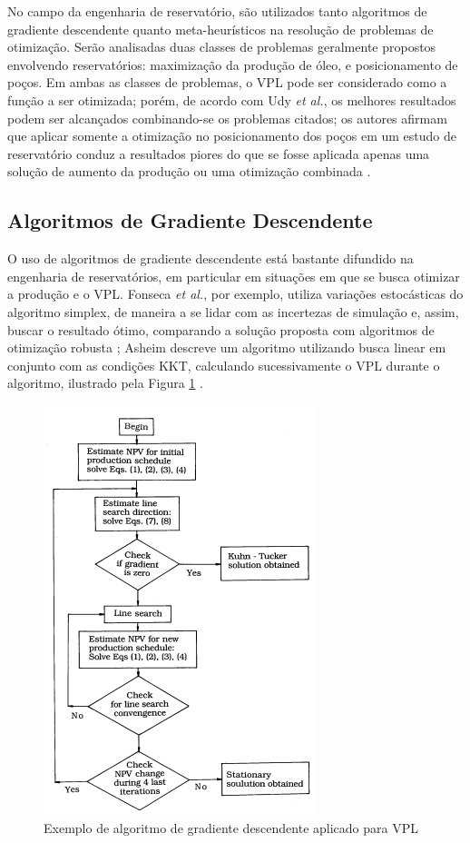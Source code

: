 No campo da engenharia de reservat\'{o}rio, s\~{a}o utilizados tanto algoritmos de gradiente descendente quanto meta-heur\'{i}sticos na resolu\c{c}\~{a}o de problemas de otimiza\c{c}\~{a}o. Ser\~{a}o analisadas duas classes de problemas geralmente propostos envolvendo reservat\'{o}rios: maximiza\c{c}\~{a}o da produ\c{c}\~{a}o de \'{o}leo, e posicionamento de po\c{c}os. Em ambas as classes de problemas, o VPL pode ser considerado como a fun\c{c}\~{a}o a ser otimizada; por\'{e}m, de acordo com Udy \textit{et al.}, os melhores resultados podem ser alcan\c{c}ados combinando-se os problemas citados; os autores afirmam que aplicar somente a otimiza\c{c}\~{a}o no posicionamento dos po\c{c}os em um estudo de reservat\'{o}rio conduz a resultados piores do que se fosse aplicada apenas uma solu\c{c}\~{a}o de aumento da produ\c{c}\~{a}o ou uma otimiza\c{c}\~{a}o combinada \cite{udyEOR}.
\nocite{EOR:Intro}


\subsection{Algoritmos de Gradiente Descendente}
O uso de algoritmos de gradiente descendente est\'{a} bastante difundido na engenharia de reservat\'{o}rios, em particular em situa\c{c}\~{o}es em que se busca otimizar a produ\c{c}\~{a}o e o VPL. Fonseca \textit{et al.}, por exemplo, utiliza varia\c{c}\~{o}es estoc\'{a}sticas do algoritmo simplex, de maneira a se lidar com as incertezas de simula\c{c}\~{a}o e, assim, buscar o resultado \'{o}timo, comparando a solu\c{c}\~{a}o proposta com algoritmos de otimiza\c{c}\~{a}o robusta \cite{fonseca}; Asheim descreve um algoritmo utilizando busca linear em conjunto com as condi\c{c}\~{o}es KKT, calculando sucessivamente o VPL durante o algoritmo, ilustrado pela Figura \ref{fig:asheim1} \cite{asheim88}.

\begin{figure}[H]
	\centering
	\includegraphics[width=.5\textwidth]{figs/revisao/revisao_asheim1}
	\caption{Exemplo de algoritmo de gradiente descendente aplicado para VPL \cite{asheim88}\label{fig:asheim1}}
\end{figure}

